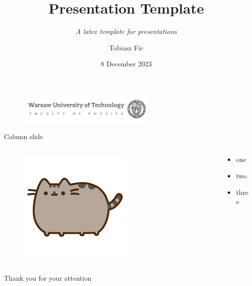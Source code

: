 

\title{Presentation Template}
    \subtitle{\textit{A latex template for presentations}}
\author{Tobiasz Fic}
\date{8 December 2023}



\begin{frame}
    \maketitle
    \begin{figure}
        \centering
        \includegraphics[width=0.6\textwidth]{images/logo_eng.png}
    \end{figure}
\end{frame}

\begin{frame}{Column slide}
    \begin{columns}
        \begin{column}{0.5\textwidth}
            \begin{figure}
                \centering
                \includegraphics[width=0.6\textwidth]{images/pusheen.png}
            \end{figure}
        \end{column}
        \begin{column}{0.5\textwidth}
            \begin{itemize}
                \item one
                \item two
                \item three
            \end{itemize}
        \end{column}
    \end{columns}

\end{frame}

\begin{frame}{}
    \centering
    \Large{Thank you for your attention}
\end{frame}

